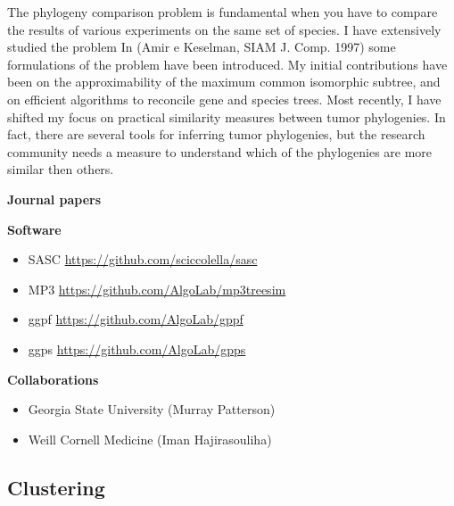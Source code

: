 \documentclass[11pt,a4paper,roman]{moderncv}
\begin{document}
The phylogeny comparison problem is fundamental when you have to compare
the results of various experiments on the same set of species. I have
extensively studied the problem In (Amir e Keselman, SIAM J. Comp. 1997)
some formulations of the problem have been introduced. My initial contributions
have been on the approximability of the maximum common isomorphic
subtree, and on efficient algorithms to reconcile gene and species trees.
Most recently, I have shifted my focus on practical similarity measures between
tumor phylogenies.
In fact, there are several tools for inferring tumor phylogenies, but the
research community needs a measure to understand which of the phylogenies are
more similar then others.


\textbf{Journal papers}

\cite{DBLP:journals/jcb/AliCLVP21}
\cite{DBLP:journals/bioinformatics/CiccolellaRGPSB21}
\cite{DBLP:journals/bioinformatics/CiccolellaBDBPV21}
\cite{DBLP:journals/bmcbi/CiccolellaGPVHB20}
\cite{DBLP:journals/tcbb/BonizzoniCVS19}
\cite{DBLP:journals/tcs/BonizzoniCVRT17}
\cite{DBLP:journals/fuin/BonizzoniCVRT17}
\cite{bonizzoniExplainingEvolutionConstrained2014}
\cite{DBLP:journals/tcs/BonizzoniVD05}
\cite{DBLP:journals/bioinformatics/VedovaW02}
\cite{DBLP:journals/ijfcs/BonizzoniVM00}


\textbf{Software}

\begin{itemize}
\item
     SASC \url{https://github.com/sciccolella/sasc}
\item
      MP3 \url{https://github.com/AlgoLab/mp3treesim}
\item
      ggpf \url{https://github.com/AlgoLab/gppf}
\item
      ggps \url{https://github.com/AlgoLab/gpps}
\end{itemize}

\textbf{Collaborations}

\begin{itemize}
\item
      Georgia State University (Murray Patterson)
\item
      Weill Cornell Medicine (Iman Hajirasouliha)
\end{itemize}

\subsection{Clustering}\label{clustering}
\end{document}
